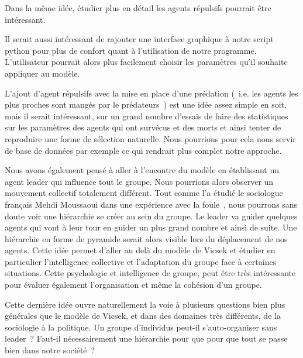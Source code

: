 \documentclass[french, a4paper, 12pt]{article}
\begin{document}
	Dans la même idée, étudier plus en détail les agents répulsifs pourrait être intéressant.
	
	Il serait aussi intéressant de rajouter une interface graphique à notre script python pour plus de confort quant à l'utilisation de notre programme. L'utilisateur pourrait alors plus facilement choisir les paramètres qu'il souhaite appliquer au modèle.

	L'ajout d'agent répulsifs avec la mise en place d'une prédation (~i.e. les agents les plus proches sont mangés par le prédateurs~) est une idée assez simple en soit, mais il serait intéressant, sur un grand nombre d'essais de faire des statistiques sur les paramètres des agents qui ont survécus et des morts et ainsi tenter de reproduire une forme de sélection naturelle. Nous pourrions pour cela nous servir de base de données par exemple ce qui rendrait plus complet notre approche.
	
	Nous avons également pensé à aller à l'encontre du modèle en établissant un agent leader qui influence tout le groupe. Nous pourrions alors observer un mouvement collectif totalement différent. Tout comme l'a étudié le sociologue français Mehdi Moussaoui dans une expérience avec la foule~\cite{fouloscopie}, nous pourrons sans doute voir une hiérarchie se créer au sein du groupe. Le leader va guider quelques agents qui vont à leur tour en guider un plus grand nombre et ainsi de suite. Une hiérarchie en forme de pyramide serait alors visible lors du déplacement de nos agents. Cette idée permet d'aller au delà du modèle de Vicsek et étudier en particulier l'intelligence collective et l'adaptation du groupe face à certaines situations. Cette psychologie et intelligence de groupe, peut être très intéressante pour évaluer également l'organisation et même la cohésion d'un groupe.
	
	Cette dernière idée ouvre naturellement la voie à plusieurs questions bien plus générales que le modèle de Vicsek, et dans des domaines très différents, de la sociologie à la politique. Un groupe d'individus peut-il s'auto-organiser sans leader~? Faut-il nécessairement une hiérarchie pour que pour que tout se passe bien dans notre société~?   
       



\end{document}
